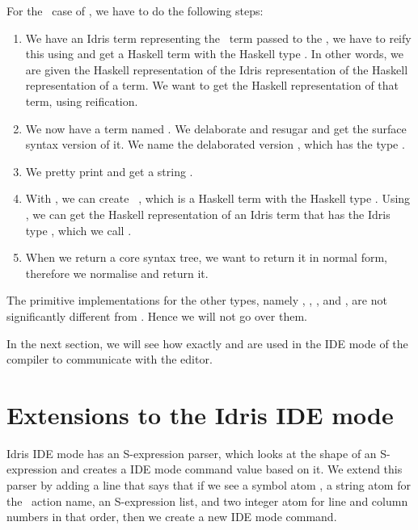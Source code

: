For the \TT\ case of , we have to do the following steps:
\begin{enumerate}
  \item We have an Idris term  representing the \TT\ term passed to
    the , we have to reify this using  and
    get a Haskell term with the Haskell type .
    In other words, we are given the Haskell representation of the Idris
    representation of the Haskell representation of a term.
    We want to get the Haskell representation of that term, using reification.
  \item We now have a  term named . We delaborate and resugar
     and get the surface syntax version of it. We name the delaborated
    version , which has the type .
  \item We pretty print  and get a string .
  \item With , we can create \texttt{ }, which is a
    Haskell term with the Haskell type . Using , we
    can get the Haskell representation of an Idris term that has the Idris type
    , which we call .
  \item When we return a core syntax tree, we want to return it in normal form,
    therefore we normalise  and return it.
\end{enumerate}

The primitive implementations for the other types, namely ,
, , and , are not significantly
different from . Hence we will not go over them.

In the next section, we will see how exactly  and 
are used in the IDE mode of the compiler to communicate with the editor.

\section{Extensions to the Idris IDE mode}\label{sec:idemode}

Idris IDE mode has an S-expression parser, which looks at the shape of an
S-expression and creates a IDE mode command value based on it. We extend this
parser by adding a line that says that if we see a symbol atom ,
a string atom for the \Elab\ action name, an S-expression list, and two integer
atom for line and column numbers in that order, then we create a new IDE mode
command.

